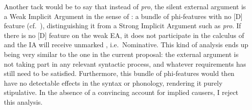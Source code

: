 \begin{exe}
\begin{xlist}
\begin{xlist}
\begin{exe}
\begin{exe}
\begin{xlist}
\begin{exe}
\begin{xlist}
\begin{exe}
\begin{xlist}
\begin{xlist}
\begin{exe}
\begin{xlist}
\begin{exe}
\begin{xlist}
\begin{exe}
\begin{xlist}
\begin{exe}
\begin{exe}
\begin{exe}
\begin{xlist}
\begin{exe}
\begin{exe}
\begin{xlist}
\begin{xlist}
\begin{exe}
\begin{xlist}
\begin{exe}
\begin{exe}
\begin{xlist}
\begin{exe}
\begin{exe}
\begin{xlist}
\begin{exe}
\begin{xlist}
\begin{exe}
\begin{xlist}
\begin{exe}
\begin{xlist}
\begin{exe}
\begin{exe}
\begin{xlist}
\begin{exe}
\begin{exe}
\begin{xlist}
\begin{xlist}
\begin{exe}
\begin{xlist}
\begin{xlist}
\begin{exe}
\begin{xlist}
\begin{exe}
\begin{xlist}
\begin{exe}
\begin{xlist}
\begin{exe}
\begin{xlist}
\begin{exe}
\begin{exe}
\begin{exe}
\begin{exe}
\begin{xlist}
\begin{exe}
\begin{exe}
\begin{xlist}
\begin{xlist}
\begin{exe}
\begin{exe}
\begin{xlist}
\begin{exe}
\begin{xlist}
\begin{exe}
\begin{xlist}
	
 \z
\z 

Another tack would be to say that instead of \emph{pro}, the silent external argument is a Weak Implicit Argument in the sense of \cite{landau10}: a bundle of phi-features with no [D] feature (cf.~\citealt{legate14,bhattpancheva17}), distinguishing it from a Strong Implicit Argument such as \emph{pro}. If there is no [D] feature on the weak EA, it does not participate in the calculus of  and the IA will receive unmarked , i.e.~Nominative. This kind of analysis ends up being very similar to the one in the current proposal: the external argument is not taking part in any relevant syntactic process, and whatever requirements {\vd} has still need to be satisfied. Furthermore, this bundle of phi-features would then have no detectable effects in the syntax or phonology, rendering it purely stipulative. In the absence of a convincing account for implied causers, I reject this analysis.


\end{xlist}
\end{exe}
\end{xlist}
\end{exe}
\end{xlist}
\end{exe}
\end{exe}
\end{xlist}
\end{xlist}
\end{exe}
\end{exe}
\end{xlist}
\end{exe}
\end{exe}
\end{exe}
\end{exe}
\end{xlist}
\end{exe}
\end{xlist}
\end{exe}
\end{xlist}
\end{exe}
\end{xlist}
\end{exe}
\end{xlist}
\end{xlist}
\end{exe}
\end{xlist}
\end{xlist}
\end{exe}
\end{exe}
\end{xlist}
\end{exe}
\end{exe}
\end{xlist}
\end{exe}
\end{xlist}
\end{exe}
\end{xlist}
\end{exe}
\end{xlist}
\end{exe}
\end{exe}
\end{xlist}
\end{exe}
\end{exe}
\end{xlist}
\end{exe}
\end{xlist}
\end{xlist}
\end{exe}
\end{exe}
\end{xlist}
\end{exe}
\end{exe}
\end{exe}
\end{xlist}
\end{exe}
\end{xlist}
\end{exe}
\end{xlist}
\end{exe}
\end{xlist}
\end{xlist}
\end{exe}
\end{xlist}
\end{exe}
\end{xlist}
\end{exe}
\end{exe}
\end{xlist}
\end{xlist}
\end{exe}
